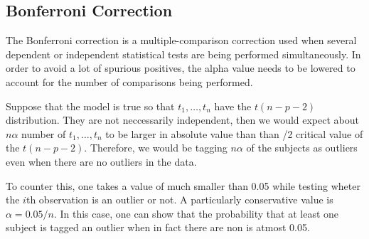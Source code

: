 \subsection{Bonferroni Correction}
The Bonferroni correction is a multiple-comparison correction used when several
dependent or independent statistical tests are being performed simultaneously.
In order to avoid a lot of spurious positives, the alpha value needs to be 
lowered to account for the number of comparisons being performed.

Suppose that the model is true so that $t_{1}, \hdots, t_{n}$ have the $t(n-p-2)$
distribution. They are not neccessarily independent, then we would expect about
$n \alpha$ number of $t_{1}, \hdots, t_{n}$ to be larger in absolute value than 
than \alpha/2 critical value of the $t(n-p-2)$. Therefore, we would be tagging 
$n \alpha$ of the subjects as outliers even when there are no outliers in the 
data.

To counter this, one takes a value of \alpha much smaller than 0.05 while 
testing wheter the $i$th observation is an outlier or not. A particularly conservative value is $\alpha = 0.05/n$. In this case, one can show that the probability that at least one subject is tagged an outlier when in fact there are non is atmost 0.05. 

